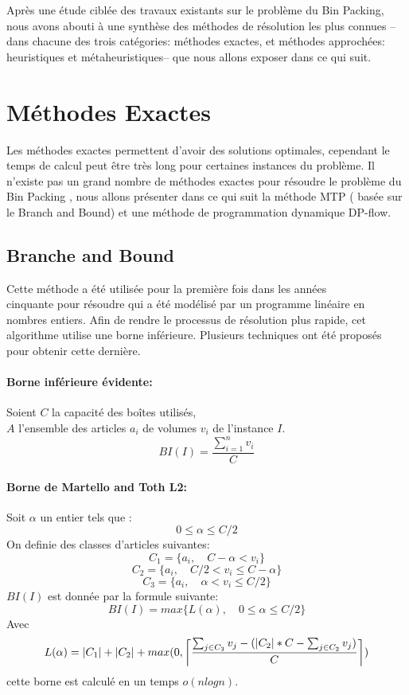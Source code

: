 \documentclass[class=report, crop=false]{standalone}
\DeclarePairedDelimiter\ceil{\lceil}{\rceil}
\begin{document}
    Après une étude ciblée des travaux existants sur le problème du Bin Packing, nous avons abouti à une synthèse des méthodes de résolution les plus connues --dans chacune des trois catégories: méthodes exactes, et méthodes approchées: heuristiques et métaheuristiques-- que nous allons exposer dans ce qui suit. 
    \section{Méthodes Exactes}
    Les méthodes exactes permettent d’avoir des solutions optimales, cependant le temps de calcul peut être très long pour certaines instances du problème. Il n’existe pas un grand nombre de méthodes exactes pour résoudre le problème du Bin Packing , nous allons présenter dans ce qui suit la méthode  MTP ( basée sur le Branch and Bound) et une méthode de programmation dynamique DP-flow.
    \subsection{Branche and Bound}
    Cette méthode a été  utilisée pour la première fois dans les années \\ cinquante pour résoudre qui a été  modélisé par un programme linéaire en nombres entiers.
Afin de rendre le processus de résolution plus rapide, cet algorithme utilise une borne inférieure. Plusieurs techniques ont été proposés pour obtenir cette dernière.
    \paragraph{Borne inférieure évidente:} Soient \(C\) la capacité des boîtes utilisés,\\
     \(A\) l’ensemble des articles \(a_i\) de volumes \(v_i\) de l’instance \(I\).
        \[BI(I)=\frac{\displaystyle\sum_{i=1}^{n} v_i}{C}\]
    \paragraph{Borne de Martello and Toth L2:}  
    Soit \(\alpha\) un entier tels que :
    \[0 \le \alpha \le C/2\]
    On definie des classes d'articles suivantes: 
    \[C_1 = \{a_i, \quad C-\alpha < v_i\} \]
    \[C_2 = \{a_i, \quad C/2 < v_i \le C-\alpha\} \]
    \[C_3 = \{a_i, \quad \alpha < v_i \le C/2\} \]
    \(BI(I)\)  est donnée par la formule suivante:
    \[BI(I)=max\{L(\alpha),\quad 0 \le \alpha \le C/2\}\]
    Avec
    \[L(\alpha)=|C_1|+|C_2|+max(0, \ceil*{\frac{\sum_{j \in C_3}^{} v_j - (|C_2|*C - \sum_{j \in C_2}^{} v_j) }{C}})\]
    cette borne est calculé en un temps \(o(nlogn)\).
\end{document}
